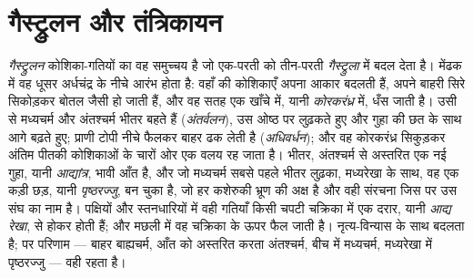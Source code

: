 \section{गैस्ट्रुलन और तंत्रिकायन}

\begin{proposition}[गैस्ट्रुलन]\label{prop:b2:vertebrate-development:gastrulation}
\emph{गैस्ट्रुलन} कोशिका-गतियों का वह समुच्चय है जो एक-परती
 को तीन-परती \emph{गैस्ट्रुला} में बदल देता है। मेंढक में
वह धूसर अर्धचंद्र के नीचे आरंभ होता है: वहाँ की कोशिकाएँ अपना आकार बदलती
हैं, अपने बाहरी सिरे सिकोड़कर बोतल जैसी हो जाती हैं, और वह सतह एक
खाँचे में, यानी \emph{कोरकरंध्र} में, धँस जाती है। उसी से मध्यचर्म और
अंतश्चर्म भीतर बहते हैं (\emph{अंतर्वलन}), उस ओष्ठ पर लुढ़कते हुए
और गुहा की छत के साथ आगे बढ़ते हुए; प्राणी टोपी नीचे फैलकर बाहर ढक
लेती है (\emph{अधिवर्धन}); और वह कोरकरंध्र सिकुड़कर अंतिम पीतकी कोशिकाओं
के चारों ओर एक वलय रह जाता है। भीतर, अंतश्चर्म से अस्तरित एक नई गुहा,
यानी \emph{आद्यांत्र}, भावी आँत है, और जो मध्यचर्म सबसे पहले भीतर
लुढ़का, मध्यरेखा के साथ, वह एक कड़ी छड़, यानी \emph{पृष्ठरज्जु}, बन चुका
है, जो हर कशेरुकी भ्रूण की अक्ष है और वही संरचना जिस पर उस संघ का नाम
है। पक्षियों और स्तनधारियों में वही गतियाँ किसी चपटी चक्रिका में एक
दरार, यानी \emph{आद्य रेखा}, से होकर होती हैं; और मछली में वह चक्रिका
 के ऊपर फैल जाती है। नृत्य-विन्यास  के साथ बदलता है; पर परिणाम
--- बाहर बाह्यचर्म, आँत को अस्तरित करता अंतश्चर्म, बीच में मध्यचर्म,
मध्यरेखा में पृष्ठरज्जु --- वही रहता है।
\end{proposition}

